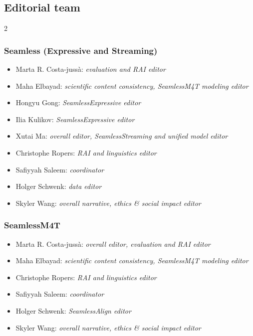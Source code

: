\vspace{10pt}

\subsection*{Editorial team}
\begin{multicols}{2}

\subsubsection*{Seamless (Expressive and Streaming)}
\begin{itemize}[itemsep=0.00cm,parsep=0.0cm,left=0pt, label={}]
\item Marta R. Costa-jussà: \textit{evaluation and RAI editor}
\item Maha Elbayad: \textit{scientific content consistency, SeamlessM4T modeling editor}
\item Hongyu Gong: \textit{SeamlessExpressive editor}
\item Ilia Kulikov: \textit{SeamlessExpressive editor}
\item Xutai Ma: \textit{overall editor, SeamlessStreaming and unified model editor}
\item Christophe Ropers: \textit{RAI and linguistics editor }

\item Safiyyah Saleem: \textit{coordinator} 
\item Holger Schwenk: \textit{data editor}
\item Skyler Wang: \textit{overall narrative, ethics \& social impact editor }
\end{itemize}
\columnbreak

\subsubsection*{SeamlessM4T}
\begin{itemize}[itemsep=0.00cm,parsep=0.0cm,left=0pt, label={}]
\item Marta R. Costa-jussà: \textit{overall editor, evaluation and RAI editor}
\item Maha Elbayad: \textit{scientific content consistency, SeamlessM4T modeling editor}
\item Christophe Ropers: \textit{RAI and linguistics editor }
\item Safiyyah Saleem: \textit{coordinator} 
\item Holger Schwenk: \textit{SeamlessAlign editor}
\item Skyler Wang: \textit{overall narrative, ethics \& social impact editor }
\end{itemize}

\end{multicols}

